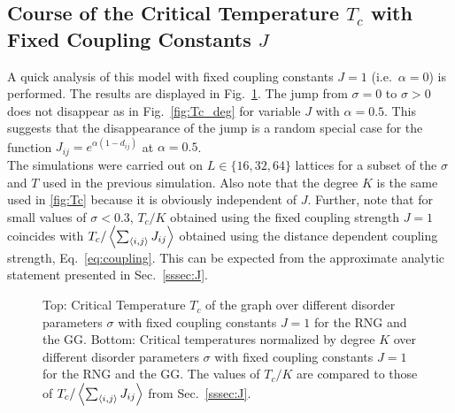     \subsection{Course of the Critical Temperature $T_c$ with Fixed Coupling Constants $J$}
    \label{appendix:fixedCoupling}
        A quick analysis of this model with fixed coupling constants \(J = 1\)
        (i.e.\ \(\alpha=0\)) is performed. The results are displayed in Fig.\ \ref{fig:Tc_deg_A0}.
        The jump from \(\sigma=0\) to \(\sigma>0\) does not disappear as in Fig.\ \ref{fig:Tc_deg}
        for variable \(J\) with \(\alpha=0.5\). This suggests that the
        disappearance of the jump is a random special case for the function
        \(J_{ij}=e^{\alpha(1-d_{ij})}\) at \(\alpha=0.5\).\\
        The simulations were carried out on \(L \in \{16,32,64\}\) lattices
        for a subset of the \(\sigma\) and \(T\) used in the previous simulation.
        Also note that the degree \(K\) is
        the same used in \ref{fig:Tc}
        because it is obviously independent of \(J\).
        Further, note that for small values of \(\sigma < 0.3\), \(T_c / K\)
        obtained using the fixed coupling strength \(J=1\) coincides with
        \(T_c / \left< \sum_{\left< i,j \right>}J_{ij} \right>\) obtained using the distance
        dependent coupling strength, Eq.\ \ref{eq:coupling}.
        This can be expected from the approximate analytic statement presented
        in Sec.\ \ref{sssec:J}.
        \begin{figure}[htb]
            \centering


            \caption[Critical Temperature and Critical Temperature Normalized by Degree of the Graph for Fixed Coupling Constants $J=1$]
            {
                Top: Critical Temperature \(T_c\) of the graph over different
                disorder parameters \(\sigma\) with fixed coupling constants \(J=1\) for
                 the RNG and
                 the GG.
                Bottom: Critical temperatures normalized by degree \(K\) over
                different disorder parameters \(\sigma\) with fixed coupling constants \(J=1\) for
                 the RNG and
                 the GG. The values of \(T_c / K\)
                are compared to those of \(T_c /  \left< \sum_{\left< i,j \right>}J_{ij} \right>\)
                from Sec.\ \ref{sssec:J}.
            }
            \label{fig:Tc_deg_A0}
        \end{figure}\\

